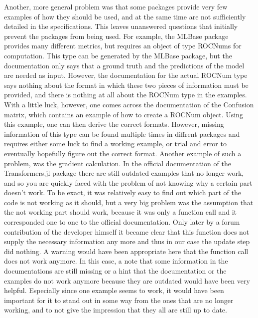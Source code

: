 Another, more general problem was that some packages provide very few examples of how they should be used, and at the same time are not sufficiently detailed in the specifications. This leaves unanswered questions that initially prevent the packages from being used. For example, the MLBase package provides many different metrics, but requires an object of type ROCNums for computation. This type can be generated by the MLBase package, but the documentation only says that a ground truth and the predictions of the model are needed as input. However, the documentation for the actual ROCNum type says nothing about the format in which these two pieces of information must be provided, and there is nothing at all about the ROCNum type in the examples. With a little luck, however, one comes across the documentation of the Confusion matrix, which contains an example of how to create a ROCNum object. Using this example, one can then derive the correct formats. However, missing information of this type can be found multiple times in diffrent packages and requires either some luck to find a working example, or trial and error to eventually hopefully figure out the correct format.  Another example of such a problem, was the gradient calculation. In the official documentation of the Transformers.jl package there are still outdated examples that no longer work, and so you are quickly faced with the problem of not knowing why a certain part doesn't work. To be exact, it was relatively easy to find out which part of the code is not working as it should, but a very big problem was the assumption that the not working part should work, because it was only a function call and it corresponded one to one to the official documentation. Only later by a forum contribution of the developer himself it became clear that this function does not supply the necessary information any more and thus in our case the update step did nothing. A warning would have been appropriate here that the function call does not work anymore. In this case, a note that some information in the documentations are still missing or a hint that the documentation or the examples do not work anymore because they are outdated would have been very helpful. Especially since one example seems to work, it would have been important for it to stand out in some way from the ones that are no longer working, and to not give the impression that they all are still up to date.

